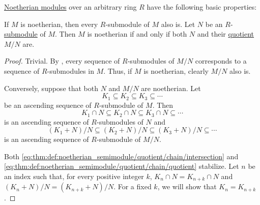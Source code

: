 \begin{proposition}\label{thm:def:noetherian_semimodule}
  \hyperref[def:noetherian_semimodule]{Noetherian modules} over an arbitrary ring \( R \) have the following basic properties:
  \begin{thmenum}
     If \( M \) is noetherian, then every \( R \)-submodule of \( M \) also is.
     Let \( N \) be an \( R \)-\hyperref[def:module/submodel]{submodule} of \( M \). Then \( M \) is noetherian if and only if both \( N \) and their \hyperref[def:module/quotient]{quotient} \( M / N \) are.
  \end{thmenum}
\end{proposition}
\begin{proof}
   Trivial.
   By , every sequence of \( R \)-submodules of \( M / N \) corresponds to a sequence of \( R \)-submodules in \( M \). Thus, if \( M \) is noetherian, clearly \( M / N \) also is.

  Conversely, suppose that both \( N \) and \( M / N \) are noetherian. Let
  \begin{equation}\label{eq:thm:def:noetherian_semimodule/quotient/chain}
    K_1 \subseteq K_2 \subseteq K_3 \subseteq \cdots
  \end{equation}
  be an ascending sequence of \( R \)-submodule of \( M \). Then
  \begin{equation}\label{eq:thm:def:noetherian_semimodule/quotient/chain/intersection}
    K_1 \cap N \subseteq K_2 \cap N \subseteq K_3 \cap N \subseteq \cdots
  \end{equation}
  is an ascending sequence of \( R \)-submodules of \( N \) and
  \begin{equation}\label{eq:thm:def:noetherian_semimodule/quotient/chain/quotient}
    (K_1 + N) / N \subseteq (K_2 + N) / N \subseteq (K_3 + N) / N \subseteq \cdots
  \end{equation}
  is an ascending sequence of \( R \)-submodule of \( M / N \).

  Both \eqref{eq:thm:def:noetherian_semimodule/quotient/chain/intersection} and \eqref{eq:thm:def:noetherian_semimodule/quotient/chain/quotient} stabilize. Let \( n \) be an index such that, for every positive integer \( k \), \( K_n \cap N = K_{n + k} \cap N \) and \( (K_n + N) / N = (K_{n + k} + N) / N \). For a fixed \( k \), we will show that \( K_n = K_{n + k} \).


\end{proof}
